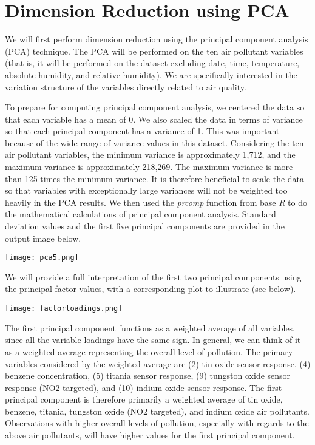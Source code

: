 \documentclass{article}
\begin{document}
\section{Dimension Reduction using PCA}

We will first perform dimension reduction using the principal component analysis (PCA) technique. The PCA will be performed on the ten air pollutant variables (that is, it will be performed on the dataset excluding date, time, temperature, absolute humidity, and relative humidity). We are specifically interested in the variation structure of the variables directly related to air quality.

\smallskip

To prepare for computing principal component analysis, we centered the data so that each variable has a mean of 0. We also scaled the data in terms of variance so that each principal component has a variance of 1. This was important because of the wide range of variance values in this dataset. Considering the ten air pollutant variables, the minimum variance is approximately 1,712, and the maximum variance is approximately 218,269. The maximum variance is more than 125 times the minimum variance. It is therefore beneficial to scale the data so that variables with exceptionally large variances will not be weighted too heavily in the PCA results. We then used the \textit{prcomp} function from base \textit{R} to do the mathematical calculations of principal component analysis. Standard deviation values and the first five principal components are provided in the output image below.

\smallskip

\texttt{[image: pca5.png]}

\smallskip

We will provide a full interpretation of the first two principal components using the principal factor values, with a corresponding plot to illustrate (see below). 

\texttt{[image: factorloadings.png]}

The first principal component functions as a weighted average of all variables, since all the variable loadings have the same sign. In general, we can think of it as a weighted average representing the overall level of pollution. The primary variables considered by the weighted average are (2) tin oxide sensor response, (4) benzene concentration, (5) titania sensor response, (9) tungston oxide sensor response (NO2 targeted), and (10) indium oxide sensor response. The first principal component is therefore primarily a weighted average of tin oxide, benzene, titania, tungston oxide (NO2 targeted), and indium oxide air pollutants. Observations with higher overall levels of pollution, especially with regards to the above air pollutants, will have higher values for the first principal component.
\end{document}
